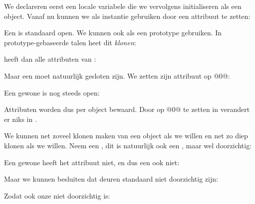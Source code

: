 
We declareren eerst een locale variabele die we vervolgens initialiseren als een object. Vanaf nu kunnen we  als instantie gebruiken door een attribuut te zetten:


Een  is standaard open. We kunnen  ook als een prototype gebruiken. In prototype-gebaseerde talen heet dit \emph{klonen}:


 heeft dan alle attributen van :


Maar een  moet natuurlijk gesloten zijn. We zetten zijn attribuut  op @0@:


Een gewone  is nog steeds open:


Attributen worden dus per object bewaard. Door  op @0@ te zetten in  verandert er niks in .

We kunnen net zoveel klonen maken van een object als we willen en net zo diep klonen als we willen. Neem een , dit is natuurlijk ook een , maar wel doorzichtig:


Een gewone  heeft het attribuut  niet, en dus een  ook niet:


Maar we kunnen besluiten dat deuren standaard niet doorzichtig zijn:


Zodat ook onze  niet doorzichtig is:


